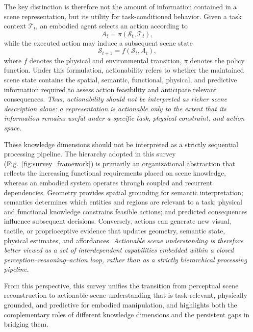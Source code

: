 \documentclass{SCIS2026}
\begin{document}
The key distinction is therefore not the amount of information contained in a scene representation, but its utility for task-conditioned behavior. Given a task context $\mathcal{T}_t$, an embodied agent selects an action according to
\begin{equation}
A_t=\pi(\mathcal{S}_t,\mathcal{T}_t),
\end{equation}
while the executed action may induce a subsequent scene state
\begin{equation}
\mathcal{S}_{t+1}=f(\mathcal{S}_t,A_t),
\end{equation}
where $f$ denotes the physical and environmental transition, $\pi$ denotes the policy function. Under this formulation, actionability refers to whether the maintained scene state contains the spatial, semantic, functional, physical, and predictive information required to assess action feasibility and anticipate relevant consequences. \emph{Thus, actionability should not be interpreted as richer scene description alone: a representation is actionable only to the extent that its information remains useful under a specific task, physical constraint, and action space.}

These knowledge dimensions should not be interpreted as a strictly sequential processing pipeline. The hierarchy adopted in this survey (Fig.~\ref{fig:survey_framework}) is primarily an organizational abstraction that reflects the increasing functional requirements placed on scene knowledge, whereas an embodied system operates through coupled and recurrent dependencies. Geometry provides spatial grounding for semantic interpretation; semantics determines which entities and regions are relevant to a task; physical and functional knowledge constrains feasible actions; and predicted consequences influence subsequent decisions. Conversely, actions can generate new visual, tactile, or proprioceptive evidence that updates geometry, semantic state, physical estimates, and affordances. \emph{Actionable scene understanding is therefore better viewed as a set of interdependent capabilities embedded within a closed perception--reasoning--action loop, rather than as a strictly hierarchical processing pipeline.}

From this perspective, this survey unifies the transition from perceptual scene reconstruction to actionable scene understanding that is task-relevant, physically grounded, and predictive for embodied manipulation, and highlights both the complementary roles of different knowledge dimensions and the persistent gaps in bridging them.
\end{document}
